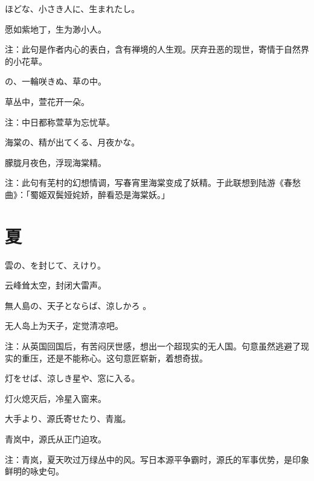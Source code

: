 \begin{haiku}
    {\FH {}ほどな、小さき人に、生まれたし。}

    {\FK 愿如紫地丁，生为渺小人。}

    {\FT 注：此句是作者内心的表白，含有禅境的人生观。厌弃丑恶的现世，寄情于自然界的小花草。}
\end{haiku}

\begin{haiku}
    {\FH {}の、一輪咲きぬ、草の中。}

    {\FK 草丛中，萱花开一朵。}

    {\FT 注：中日都称萱草为忘忧草。}
\end{haiku}

\begin{haiku}
    {\FH 海棠の、精が出てくる、月夜かな。}

    {\FK 朦胧月夜色，浮现海棠精。}

    {\FT 注：此句有芜村的幻想情调，写春宵里海棠变成了妖精。于此联想到陆游《春愁曲》：「蜀姬双鬓娅姹娇，醉看恐是海棠妖。」}
\end{haiku}

\section{\FK 夏}

\setcounter{haikucounter}{0}

\begin{haiku}
    {\FH 雲の、を封じて、えけり。}

    {\FK 云峰耸太空，封闭大雷声。}
\end{haiku}

\begin{haiku}
    {\FH 無人島の、天子とならば、涼しかろ
    。}

    {\FK 无人岛上为天子，定觉清凉吧。}

    {\FT 注：从英国回国后，有苦闷厌世感，想出一个超现实的无人国。句意虽然逃避了现实的重压，还是不能称心。这句意匠崭新，着想奇拔。}
\end{haiku}

\begin{haiku}
    {\FH 灯をせば、涼しき星や、窓に入る。}

    {\FK 灯火熄灭后，冷星入窗来。}
\end{haiku}

\begin{haiku}
    {\FH 大手より、源氏寄せたり、青嵐。}

    {\FK 青岚中，源氏从正门迫攻。}

    {\FT 注：青岚，夏天吹过万绿丛中的风。写日本源平争霸时，源氏的军事优势，是印象鲜明的咏史句。}
\end{haiku}

